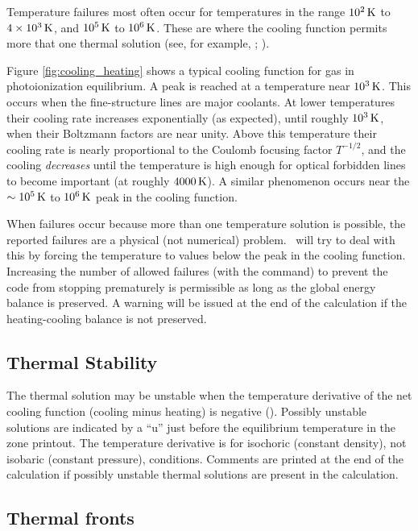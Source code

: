 Temperature failures most often occur for temperatures
in the range $10^2 {\rm\thinspace K}$
to $4\times 10^3 {\rm\thinspace K}$, and $10^5 {\rm\thinspace K}$ to $10^6 {\rm\thinspace K}$.
These are where the cooling function permits
more that one thermal solution (see, for example, \citealp{Williams1967}; \citealp{Dalgarno1972}).

Figure \ref{fig:cooling_heating} shows a typical cooling function for
gas in photoionization equilibrium.
A peak is reached at a temperature near $10^3 {\rm\thinspace K}$.
This occurs
when the fine-structure lines are major coolants.
At lower temperatures
their cooling rate increases exponentially (as expected),
until roughly
$10^3 {\rm\thinspace K}$, when their Boltzmann factors are near unity.
Above this temperature
their cooling rate is nearly proportional to the Coulomb focusing factor
$T^{-1/2}$, and the cooling \emph{decreases} until the temperature
is high enough for
optical forbidden lines to become important (at roughly $4000 {\rm\thinspace K}$).
A similar
phenomenon occurs near the $\sim 10^5 {\rm\thinspace K}$ to $10^6 {\rm\thinspace K}$ peak in
the cooling function.

When failures occur because more than one temperature solution is
possible,  the reported failures are a physical (not numerical) problem.
\Cloudy\ will try to deal with this by forcing the temperature to
values below the peak in the cooling function.
Increasing the number of allowed failures
(with the  command) to prevent the code from
stopping prematurely
is permissible as long as the global energy balance is preserved.
A warning
will be issued at the end of the calculation if the heating-cooling balance
is not preserved.

\subsection{Thermal Stability}

The thermal solution may be unstable when the temperature derivative
of the net cooling function (cooling minus heating) is negative (\citealp{Field1965}).
Possibly unstable solutions are indicated by a ``u'' just before the
equilibrium temperature in the zone printout.  The temperature derivative
is for isochoric (constant density), not isobaric (constant pressure),
conditions.  Comments are printed at the end of the calculation if possibly
unstable thermal solutions are present in the calculation.

\subsection{Thermal fronts}

